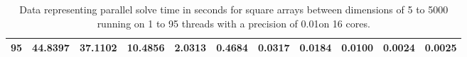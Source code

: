 \begin{table}[ht]
\begin{tabular}{|l|l|l|l|l|l|l|l|l|l|l|}
\textbf{95}      & 44.8397           & 37.1102           & 10.4856           & 2.0313            & 0.4684           & 0.0317           & 0.0184          & 0.0100          & 0.0024          & 0.0025         \\ \hline
\end{tabular}
\caption{Data representing parallel solve time in seconds for square arrays between dimensions of 5 to 5000 running on 1 to 95 threads with a precision of 0.01on 16 cores.}
\end{table}